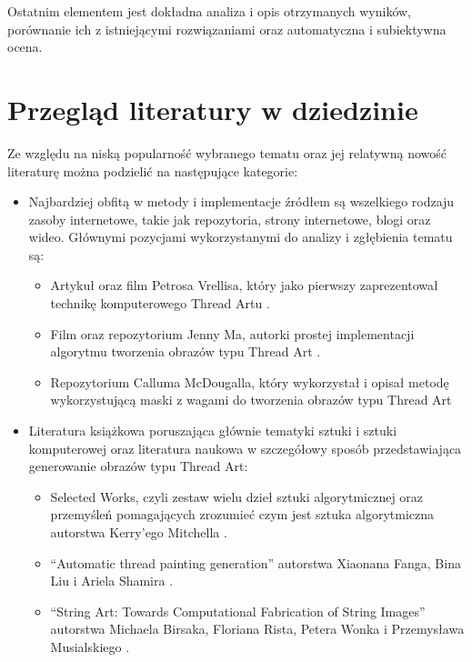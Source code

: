 \documentclass[a4paper, 12pt, polish, twoside]{extreport}
\begin{document}
    Ostatnim elementem jest dokładna analiza i opis otrzymanych wyników, porównanie ich z istniejącymi rozwiązaniami oraz automatyczna i subiektywna ocena. 

    \section{Przegląd literatury w dziedzinie} \label{intro-literature}
    Ze względu na niską popularność wybranego tematu oraz jej relatywną nowość literaturę można podzielić na następujące kategorie:
    \begin{itemize}
        \item Najbardziej obfitą w metody i implementacje źródłem są wszelkiego rodzaju zasoby internetowe, takie jak repozytoria, strony internetowe, blogi oraz wideo. Głównymi pozycjami wykorzystanymi do analizy i zgłębienia tematu są:
        \begin{itemize}
            \item Artykuł oraz film Petrosa Vrellisa, który jako pierwszy zaprezentował technikę komputerowego Thread Artu \cite{new-way-to-knit}.
            \item Film oraz repozytorium Jenny Ma, autorki prostej implementacji algorytmu tworzenia obrazów typu Thread Art \cite{jenny-github} \cite{jenny-youtube}.
            \item Repozytorium Calluma McDougalla, który wykorzystał i opisał metodę wykorzystującą maski z wagami do tworzenia obrazów typu Thread Art \cite{callum-github}
        \end{itemize}
        \item Literatura książkowa poruszająca głównie tematyki sztuki i sztuki komputerowej oraz literatura naukowa w szczegółowy sposób przedstawiająca generowanie obrazów typu Thread Art:
        \begin{itemize}
            \item Selected Works, czyli zestaw wielu dzieł sztuki algorytmicznej oraz przemyśleń pomagających zrozumieć czym jest sztuka algorytmiczna autorstwa Kerry'ego Mitchella \cite{selected-works}.
            \item ``Automatic thread painting generation'' autorstwa Xiaonana Fanga, Bina Liu i Ariela Shamira \cite{article-string-art-xiaonan}.
            \item ``String Art: Towards Computational Fabrication of String Images'' autorstwa Michaela Birsaka, Floriana Rista, Petera Wonka i Przemysława Musialskiego \cite{article-string-art-birsak}.

\end{itemize}
\end{itemize}
\end{document}
